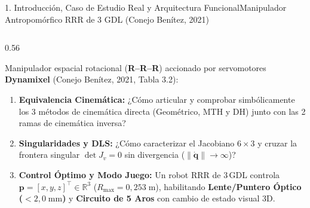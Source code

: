 \documentclass[aspectratio=169,10pt,xcolor=table]{beamer}
\newcommand{\Real}{\mathbb{R}}
\newcommand{\T}{^{\!\top}}
\newcommand{\norm}[1]{\left\lVert#1\right\rVert}
\newcommand{\qdot}{\dot{\bm{q}}}
\begin{document}
\begin{frame}{1. Introducción, Caso de Estudio Real y Arquitectura Funcional}{Manipulador Antropomórfico RRR de 3 GDL (Conejo Benítez, 2021)}
\begin{columns}[T,totalwidth=\textwidth]
  \begin{column}{0.56\textwidth}
    \begin{cajadef}
      \fontsize{6.8}{8.2}\selectfont
      Manipulador espacial rotacional (\textbf{R--R--R}) accionado por servomotores \textbf{Dynamixel} (Conejo Benítez, 2021, Tabla 3.2):\\[1mm]
    \end{cajadef}

    \vspace{0.5mm}
    \begin{cajaidea}
      \fontsize{6.2}{7.3}\selectfont
      \begin{enumerate}\setlength{\itemsep}{0.4pt}
        \item \textbf{Equivalencia Cinemática:} ¿Cómo articular y comprobar simbólicamente los 3 métodos de cinemática directa (Geométrico, MTH y DH) junto con las 2 ramas de cinemática inversa?
        \item \textbf{Singularidades y DLS:} ¿Cómo caracterizar el Jacobiano $6\times 3$ y cruzar la frontera singular $\det J_v=0$ sin divergencia ($\norm{\qdot}\to\infty$)?
        \item \textbf{Control Óptimo y Modo Juego:} Un robot RRR de 3\,GDL controla $\bm{p}=[x,y,z]\T\in\Real^3$ ($R_{\max}=0{,}253\;\text{m}$), habilitando \textbf{Lente/Puntero Óptico ($<2{,}0\;\text{mm}$)} y \textbf{Circuito de 5 Aros} con cambio de estado visual 3D.
      \end{enumerate}
    \end{cajaidea}
  \end{column}


\end{columns}
\end{frame}
\end{document}
